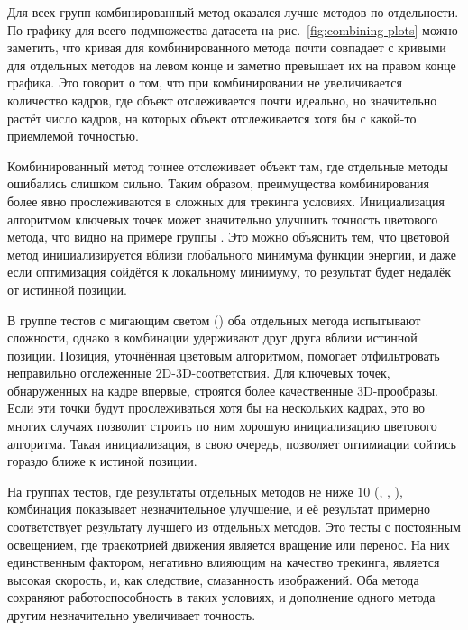 
Для всех групп комбинированный метод оказался лучше методов по отдельности.
По графику для всего подмножества датасета на рис.~\ref{fig:combining-plots}
можно заметить, что кривая для комбинированного метода почти совпадает с
кривыми для отдельных методов на левом конце и заметно превышает их на правом
конце графика.
Это говорит о том, что при комбинировании не увеличивается количество кадров,
где объект отслеживается почти идеально, но значительно растёт число кадров, на
которых объект отслеживается хотя бы с какой-то приемлемой точностью.

Комбинированный метод точнее отслеживает объект там, где отдельные методы
ошибались слишком сильно.
Таким образом, преимущества комбинирования более явно прослеживаются в сложных
для трекинга условиях.
Инициализация алгоритмом ключевых точек может значительно улучшить точность
цветового метода, что видно на примере группы .
Это можно объяснить тем, что цветовой метод инициализируется вблизи глобального
минимума функции энергии, и даже если оптимизация сойдётся к локальному
минимуму, то результат будет недалёк от истинной позиции.

В группе тестов с мигающим светом () оба отдельных метода
испытывают сложности, однако в комбинации удерживают друг друга вблизи
истинной позиции.
Позиция, уточнённая цветовым алгоритмом, помогает отфильтровать неправильно
отслеженные 2D-3D-соответствия.
Для ключевых точек, обнаруженных на кадре впервые, строятся более качественные
3D-прообразы.
Если эти точки будут прослеживаться хотя бы на нескольких кадрах, это во многих
случаях позволит строить по ним хорошую инициализацию цветового алгоритма.
Такая инициализация, в свою очередь, позволяет оптимиации сойтись гораздо ближе
к истиной позиции.

На группах тестов, где результаты отдельных методов не ниже $10$
(, , ), комбинация показывает незначительное улучшение, и её результат
примерно соответствует результату лучшего из отдельных методов.
Это тесты с постоянным освещением, где траекотрией движения является вращение
или перенос.
На них единственным фактором, негативно влияющим на качество трекинга, является
высокая скорость, и, как следствие, смазанность изображений.
Оба метода сохраняют работоспособность в таких условиях, и дополнение одного
метода другим незначительно увеличивает точность.


